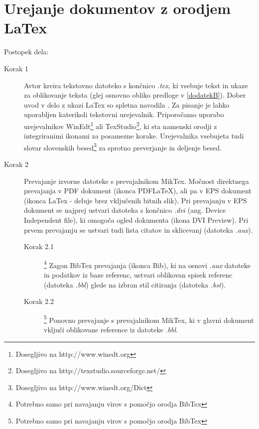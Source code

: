 \documentclass[a4paper,twoside,openright,12pt]{book}
\begin{document}
{%





\appendix
\chapter{Urejanje dokumentov z orodjem LaTex} \label{dodatekA}


Postopek dela:
\begin{description}
	
	\item[Korak 1] Avtor kreira tekstovno datoteko s končnico \emph{.tex}, ki vsebuje
	tekst in ukaze za oblikovanje teksta (glej osnovno obliko predloge v
	\ref{dodatekB}). Dober uvod v delo z ukazi LaTex so spletna navodila
	\cite{oetiker1995not}. Za pisanje je lahko uporabljen katerikoli
	tekstovni urejevalnik. Priporočamo uporabo urejevalnikov
	WinEdt\footnote{Dosegljivo na http://www.winedt.org} ali
	TexStudio\footnote{Dosegljivo na http://texstudio.sourceforge.net/},
	ki sta namenski orodji z integriranimi ikonami za posamezne korake.
	Urejevalnika vsebujeta tudi slovar slovenskih
	besed\footnote{Dosegljivo na  http://www.winedt.org/Dict} za sprotno
	preverjanje in deljenje besed.
	
	\item[Korak 2] Prevajanje izvorne datoteke s prevajalnikom MikTex. Močnost direktnega prevajanja v PDF dokument (ikonca PDFLaTeX), ali pa v EPS dokument (ikonca LaTex - deluje brez vključenih bitnih slik). Pri prevajanju v EPS dokument se najprej ustvari datoteka s končnico \emph{.dvi} (ang. Device Independent file), ki omogoča ogled dokumenta (ikona DVI Preview).
	Pri prvem prevajanju se ustvari tudi lista citatov in sklicevanj (datoteka
	\emph{.aux}).
	
	\begin{description}
		\item[Korak 2.1]\footnote{Potrebno samo pri navajanju virov s
			pomočjo orodja BibTex} Zagon BibTex prevajanja (ikonca Bib), ki na
		osnovi \emph{.aux} datoteke in podatkov iz baze referenc,
		ustvari oblikovan spisek referenc (datoteka \emph{.bbl}) glede
		na izbran stil citiranja (datoteka \emph{.bst}).
		\item[Korak 2.2]\footnote{Potrebno samo pri navajanju virov s
			pomočjo orodja BibTex} Ponovno prevajanje s prevajalnikom MikTex, ki
		v glavni dokument vključi oblikovane reference iz datoteke
		\emph{.bbl}.
	\end{description}
	

\end{description}}
\end{document}
